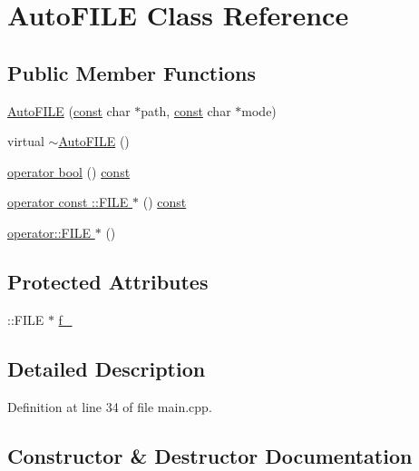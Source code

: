 \hypertarget{class_auto_f_i_l_e}{}\section{Auto\+F\+I\+LE Class Reference}
\label{class_auto_f_i_l_e}
\subsection*{Public Member Functions}
\begin{DoxyCompactItemize}
\item 
\hyperlink{class_auto_f_i_l_e_af883b09b714d2bcd3152d4b211b1b791}{Auto\+F\+I\+LE} (\hyperlink{getopt1_8c_a2c212835823e3c54a8ab6d95c652660e}{const} char $\ast$path, \hyperlink{getopt1_8c_a2c212835823e3c54a8ab6d95c652660e}{const} char $\ast$mode)
\item 
virtual \hyperlink{class_auto_f_i_l_e_ac975d31d840d450a1dc9aeb2e9460922}{$\sim$\+Auto\+F\+I\+LE} ()
\item 
\hyperlink{class_auto_f_i_l_e_af159d729616ed0a6a028108219d0dc5e}{operator bool} () \hyperlink{getopt1_8c_a2c212835823e3c54a8ab6d95c652660e}{const} 
\item 
\hyperlink{class_auto_f_i_l_e_a72288274ba6e53a80f39eae560e80be3}{operator const \+::\+F\+I\+L\+E $\ast$} () \hyperlink{getopt1_8c_a2c212835823e3c54a8ab6d95c652660e}{const} 
\item 
\hyperlink{class_auto_f_i_l_e_a899bc7763ab8fad948da00f51b26a86e}{operator\+::\+F\+I\+L\+E $\ast$} ()
\end{DoxyCompactItemize}
\subsection*{Protected Attributes}
\begin{DoxyCompactItemize}
\item 
\+::F\+I\+LE $\ast$ \hyperlink{class_auto_f_i_l_e_a089e18f78455f53196b1827b89ed6501}{f\+\_\+}
\end{DoxyCompactItemize}


\subsection{Detailed Description}


Definition at line 34 of file main.\+cpp.



\subsection{Constructor \& Destructor Documentation}
